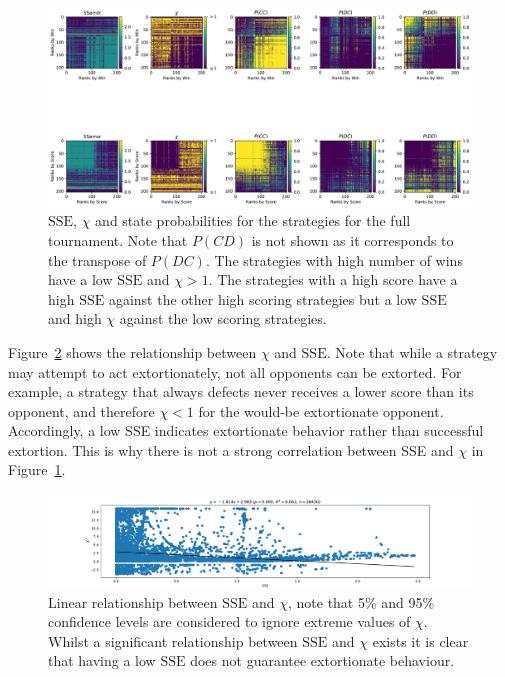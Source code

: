 \documentclass[a4paper]{article}
\newcommand{\SSe}{\text{SSE}}
\begin{document}
\begin{figure}[!htbp]
    \centering
    \includegraphics[width=.95\textwidth]{./assets/img/sse_chi_probabilities_in_full/main.pdf}
    \caption{\(\SSe\), \(\chi\) and state probabilities for the strategies for
        the full tournament. Note that \(P(CD)\) is not shown as it corresponds
        to the transpose of \(P(DC)\).  The strategies with high number of wins
        have a low \(\SSe\) and \(\chi>1\). The strategies with a high score
        have a high \(\SSe\) against the other high scoring strategies but a low
        \(\SSe\) and high \(\chi\) against the low scoring strategies.}
    \label{fig:sse_chi_probabilities_in_full}
\end{figure}

Figure~\ref{fig:relationship_between_sse_and_chi} shows the relationship between
\(\chi\) and \(\SSe\). Note that while a strategy may attempt to act
extortionately, not all opponents can be extorted. For example, a strategy
that always defects never receives a lower score than its opponent, and
therefore $\chi < 1$ for the would-be extortionate opponent. Accordingly, a low
SSE indicates extortionate behavior rather than successful extortion. This is
why there is not a strong correlation between SSE and $\chi$ in Figure~\ref{fig:sse_chi_probabilities_in_full}.

\begin{figure}[!hbtp]
    \centering
    \includegraphics[width=.95\textwidth]{./assets/img/relationship_between_sse_and_chi/main.pdf}
    \caption{Linear relationship between \(\SSe\) and \(\chi\), note that 5\%
        and 95\% confidence levels are considered to ignore extreme values of
        \(\chi\). Whilst a significant relationship between \(\SSe\) and
        \(\chi\) exists it is clear that having a low \(\SSe\) does not
        guarantee extortionate behaviour.}
    \label{fig:relationship_between_sse_and_chi}
\end{figure}
\end{document}
